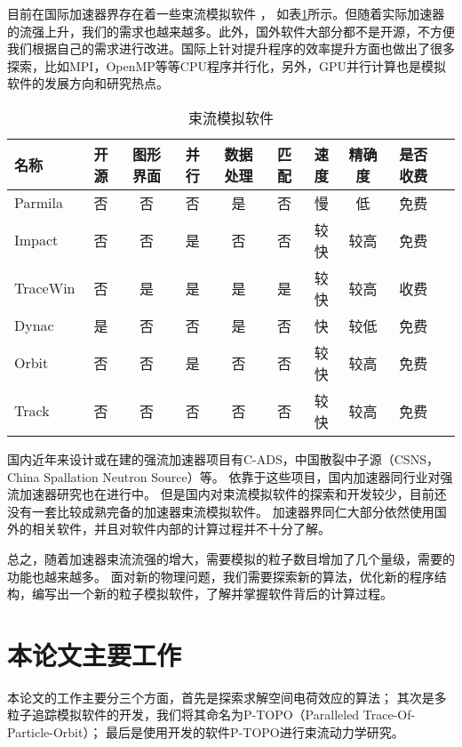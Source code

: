 目前在国际加速器界存在着一些束流模拟软件
\cite{cern_codeList,takeda1998PARMILA,qiang1999impact,uriot2014tracewin,tanke2002dynac,shishlo2006orbit,aseev2005track}，
如表\ref{tab:space_charge_code}所示。但随着实际加速器的流强上升，我们的需求也越来越多。此外，国外软件大部分都不是开源，不方便我们根据自己的需求进行改进。国际上针对提升程序的效率提升方面也做出了很多探索，比如MPI，OpenMP等等CPU程序并行化，另外，GPU并行计算也是模拟软件的发展方向和研究热点。

\begin{table}
  \centering
  \begin{tabular}{|>{\small}l|c|c|c|c|c|c|c|c|c|}
    \hline
    名称	    &开源  &图形界面 &并行	&数据处理     &匹配	&速度 &精确度	 & 是否收费  \\
    \hline
    Parmila  	&否	   &否	     &否	&是	          &否	&慢	  &低	     & 免费	\\
    Impact  	&否	   &否	     &是	&否	          &否	&较快 &较高	     & 免费	\\
    TraceWin  	&否	   &是	     &是	&是	          &是	&较快 &较高	     & 收费	\\
    Dynac  	    &是	   &否	     &否	&是	          &否	&快   &较低	     & 免费	\\
    Orbit  	    &否	   &否	     &是	&否	          &否	&较快 &较高	     & 免费	\\
    Track  	    &否	   &否	     &否	&否	          &否	&较快 &较高	     & 免费	\\
    \hline
  \end{tabular}
  \caption{束流模拟软件}
  \label{tab:space_charge_code}
\end{table}

国内近年来设计或在建的强流加速器项目有C-ADS，中国散裂中子源（CSNS，China Spallation Neutron Source）等。
依靠于这些项目，国内加速器同行业对强流加速器研究也在进行中。
但是国内对束流模拟软件的探索和开发较少，目前还没有一套比较成熟完备的加速器束流模拟软件。
加速器界同仁大部分依然使用国外的相关软件，并且对软件内部的计算过程并不十分了解。

总之，随着加速器束流流强的增大，需要模拟的粒子数目增加了几个量级，需要的功能也越来越多。
面对新的物理问题，我们需要探索新的算法，优化新的程序结构，编写出一个新的粒子模拟软件，了解并掌握软件背后的计算过程。

\section{本论文主要工作}
本论文的工作主要分三个方面，首先是探索求解空间电荷效应的算法；
其次是多粒子追踪模拟软件的开发，我们将其命名为P-TOPO（Paralleled Trace-Of-Particle-Orbit）；
最后是使用开发的软件P-TOPO进行束流动力学研究。

